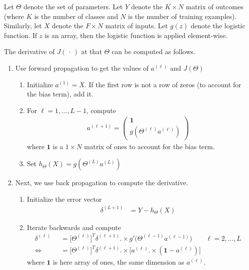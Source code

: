 \documentclass[12pt]{article}
\begin{document}
Let $\Theta$ denote the set of parameters. Let $Y$ denote
the $K\times N$ matrix of outcomes (where $K$ is the number of
classes and $N$ is the number of training examples).
Similarly, let $X$ denote the $F\times N$ matrix of inputs.
Let $g(z)$ denote the logistic function. If $z$ is an array, then the
logistic function is applied element-wise.

The derivative of $J(\,\cdot\,)$ at that $\Theta$ can be computed
as follows.
\begin{enumerate}
  \item Use forward propagation to get the values of $a^{(\ell)}$ and
    $J(\Theta)$
    \begin{enumerate}
      \item
        Initialize $a^{(1)}=X$.
        If the first row is not a row of zeros (to account for the bias
        term), add it.
      \item
        For $\ell=1,\ldots,L-1$, compute
        \begin{align*}
          a^{(\ell+1)} =
          \begin{pmatrix}
            \mathbf{1}
            \\
            g\left(
            \Theta^{(\ell)}
            a^{(\ell)}
            \right)
          \end{pmatrix}
        \end{align*}
        where $\mathbf{1}$ is a $1\times N$ matrix of ones to account
        for the bias term.
      \item
        Set $h_\Theta(X) = g\left(\Theta^{(L)}a^{(L)}\right)$
    \end{enumerate}
  \item
    Next, we use back propagation to compute the derivative.
    \begin{enumerate}
      \item
        Initialize the error vector
        \begin{align*}
          \delta^{(L+1)} &= Y - h_\Theta(X)
        \end{align*}
      \item Iterate backwards and compute
        \begin{align*}
          \delta^{(\ell)}
          &=
          \big[
          \Theta^{(\ell)}
          \big]^T
          \delta^{(\ell+1)}
          .\times
          g'\big(\Theta^{(\ell-1)}a^{(\ell-1)}\big)
          \qquad \ell = 2,\ldots,L
          \\
          \iff\qquad
          &=
          \big[
          \Theta^{(\ell)}
          \big]^T
          \delta^{(\ell+1)}
          .\times
          \big[
          a^{(\ell)}
          .\times
          \left(\mathbf{1}- a^{(\ell)}\right)
          \big]
        \end{align*}
        where $\mathbf{1}$ is here array of ones, the same dimension as
        $a^{(\ell)}$.


\end{enumerate}
\end{enumerate}
\end{document}
